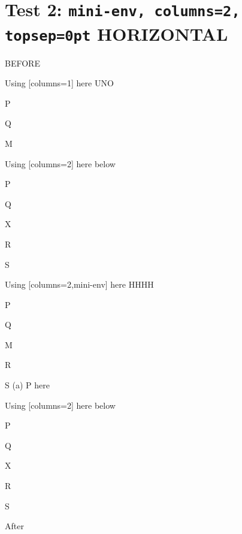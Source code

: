 \documentclass[12pt]{article}
\begin{document}
\section{Test 2: \texttt{mini-env, columns=2, topsep=0pt} HORIZONTAL}

BEFORE
\begin{enumext}[columns=2,parsep=1cm]
\item Using [columns=1] here UNO
  \begin{enumext}[columns=1,topsep=0pt,partopsep=10pt]%
     \item  P \item Q \item M %
  \end{enumext}

\item Using [columns=2] here below
\begin{enumext}[columns=2]%
     \item  P \item Q \item X  \item R \item S
  \end{enumext}

\columnbreak

\item Using [columns=2,mini-env] here HHHH
  \begin{enumext}[columns=2,mini-env={0.4\linewidth},topsep=0pt,partopsep=10pt]%
    \item  P \item Q \item M \item R \item S
    \miniright
    (a) P here
  \end{enumext}

\item Using [columns=2] here below
\begin{enumext}[columns=2]%
     \item  P \item Q \item X  \item R \item S
  \end{enumext}

\end{enumext}
After
\end{document}
